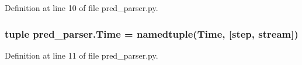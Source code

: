 Definition at line 10 of file pred\+\_\+parser.\+py.

\hypertarget{namespacepred__parser_af458c74fe479675c5d30a1dbd7375bed}{}
\subsubsection[{Time}]{\setlength{\rightskip}{0pt plus 5cm}tuple pred\+\_\+parser.\+Time = namedtuple(\textquotesingle{}Time\textquotesingle{}, \mbox{[}\textquotesingle{}step\textquotesingle{}, \textquotesingle{}stream\textquotesingle{}\mbox{]})}\label{namespacepred__parser_af458c74fe479675c5d30a1dbd7375bed}


Definition at line 11 of file pred\+\_\+parser.\+py.

